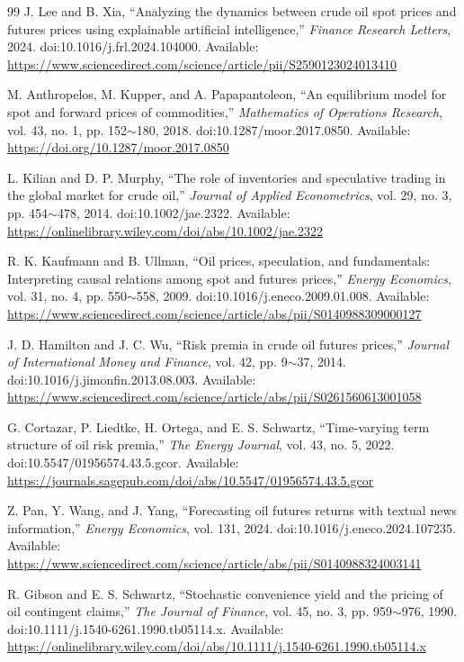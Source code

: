 \documentclass[journal]{IEEEtran}
\newcommand{\rng}{\ensuremath{\sim}}
\begin{document}
\begin{thebibliography}{99}
J. Lee and B. Xia, ``Analyzing the dynamics between crude oil spot prices and futures prices using explainable artificial intelligence,'' \textit{Finance Research Letters}, 2024. doi:10.1016/j.frl.2024.104000. Available: \url{https://www.sciencedirect.com/science/article/pii/S2590123024013410}

M. Anthropelos, M. Kupper, and A. Papapantoleon, ``An equilibrium model for spot and forward prices of commodities,'' \textit{Mathematics of Operations Research}, vol. 43, no. 1, pp. 152\rng{}180, 2018. doi:10.1287/moor.2017.0850. Available: \url{https://doi.org/10.1287/moor.2017.0850}

L. Kilian and D. P. Murphy, ``The role of inventories and speculative trading in the global market for crude oil,'' \textit{Journal of Applied Econometrics}, vol. 29, no. 3, pp. 454\rng{}478, 2014. doi:10.1002/jae.2322. Available: \url{https://onlinelibrary.wiley.com/doi/abs/10.1002/jae.2322}

R. K. Kaufmann and B. Ullman, ``Oil prices, speculation, and fundamentals: Interpreting causal relations among spot and futures prices,'' \textit{Energy Economics}, vol. 31, no. 4, pp. 550\rng{}558, 2009. doi:10.1016/j.eneco.2009.01.008. Available: \url{https://www.sciencedirect.com/science/article/abs/pii/S0140988309000127}

J. D. Hamilton and J. C. Wu, ``Risk premia in crude oil futures prices,'' \textit{Journal of International Money and Finance}, vol. 42, pp. 9\rng{}37, 2014. doi:10.1016/j.jimonfin.2013.08.003. Available: \url{https://www.sciencedirect.com/science/article/abs/pii/S0261560613001058}

G. Cortazar, P. Liedtke, H. Ortega, and E. S. Schwartz, ``Time-varying term structure of oil risk premia,'' \textit{The Energy Journal}, vol. 43, no. 5, 2022. doi:10.5547/01956574.43.5.gcor. Available: \url{https://journals.sagepub.com/doi/abs/10.5547/01956574.43.5.gcor}

Z. Pan, Y. Wang, and J. Yang, ``Forecasting oil futures returns with textual news information,'' \textit{Energy Economics}, vol. 131, 2024. doi:10.1016/j.eneco.2024.107235. Available: \url{https://www.sciencedirect.com/science/article/abs/pii/S0140988324003141}

R. Gibson and E. S. Schwartz, ``Stochastic convenience yield and the pricing of oil contingent claims,'' \textit{The Journal of Finance}, vol. 45, no. 3, pp. 959\rng{}976, 1990. doi:10.1111/j.1540-6261.1990.tb05114.x. Available: \url{https://onlinelibrary.wiley.com/doi/abs/10.1111/j.1540-6261.1990.tb05114.x}


\end{thebibliography}
\end{document}

